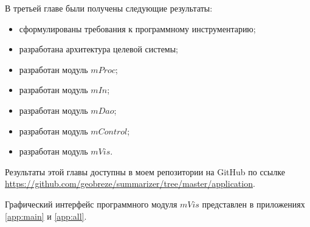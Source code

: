 В третьей главе были получены следующие результаты:
\begin{itemize}
\item сформулированы требования к программному инструментарию;
\item разработана архитектура целевой системы;
\item разработан модуль $mProc$;
\item разработан модуль $mIn$;
\item разработан модуль $mDao$;
\item разработан модуль $mControl$;
\item разработан модуль $mVis$.
\end{itemize}

Результаты этой главы доступны в моем репозитории на GitHub по ссылке \url{https://github.com/geobreze/summarizer/tree/master/application}. 

Графический интерфейс программного модуля $mVis$ представлен в приложениях \hyperref[app:main]{\ref{app:main}} и \hyperref[app:all]{\ref{app:all}}.

\newpage